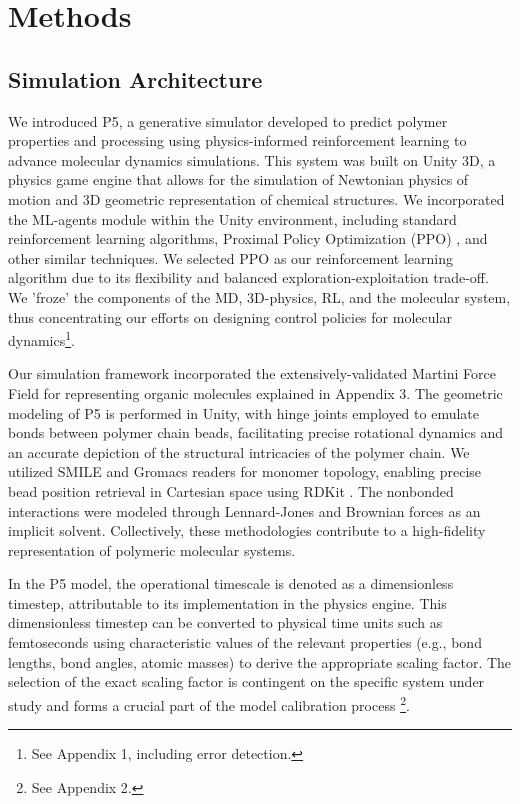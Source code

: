 \documentclass{article}
\theoremstyle{plain}
\theoremstyle{definition}
\theoremstyle{remark}
\begin{document}
\section{Methods}

\subsection{Simulation Architecture}
We introduced P5, a generative simulator developed to predict polymer properties and processing using physics-informed reinforcement learning to advance molecular dynamics simulations. This system was built on Unity 3D, a physics game engine that allows for the simulation of Newtonian physics of motion and 3D geometric representation of chemical structures. We incorporated the ML-agents module within the Unity environment, including standard reinforcement learning algorithms, Proximal Policy Optimization (PPO) \cite{schulman_proximal_2017}, and other similar techniques. We selected PPO as our reinforcement learning algorithm due to its flexibility and balanced exploration-exploitation trade-off. We 'froze' the components of the MD, 3D-physics, RL, and the molecular system, thus concentrating our efforts on designing control policies for molecular dynamics\footnote{See Appendix 1, including error detection.}.

Our simulation framework incorporated the extensively-validated Martini Force Field \cite{bereau_automated_2015} for representing organic molecules explained in Appendix 3. The geometric modeling of P5 is performed in Unity, with hinge joints employed to emulate bonds between polymer chain beads, facilitating precise rotational dynamics and an accurate depiction of the structural intricacies of the polymer chain. We utilized SMILE and Gromacs readers for monomer topology, enabling precise bead position retrieval in Cartesian space using RDKit \cite{landrum_rdkit_2010}. The nonbonded interactions were modeled through Lennard-Jones and Brownian forces as an implicit solvent. Collectively, these methodologies contribute to a high-fidelity representation of polymeric molecular systems.

In the P5 model, the operational timescale is denoted as a dimensionless timestep, attributable to its implementation in the physics engine. This dimensionless timestep can be converted to physical time units such as femtoseconds using characteristic values of the relevant properties (e.g., bond lengths, bond angles, atomic masses) to derive the appropriate scaling factor. The selection of the exact scaling factor is contingent on the specific system under study and forms a crucial part of the model calibration process \footnote{See Appendix 2.}. 
\end{document}
